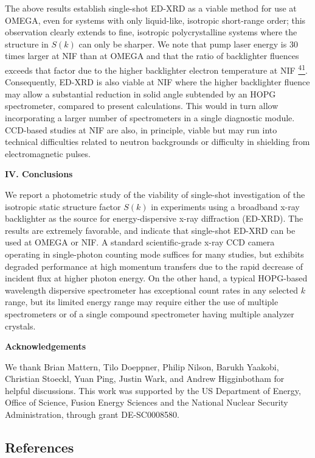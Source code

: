 The above results establish single-shot ED-XRD as a viable method for
use at OMEGA, even for systems with only liquid-like, isotropic
short-range order; this observation clearly extends to fine, isotropic
polycrystalline systems where the structure in \(S(k)\) can only be
sharper. We note that pump laser energy is 30 times larger at NIF than
at OMEGA and that the ratio of backlighter fluences exceeds that factor
due to the higher backlighter electron temperature at NIF
\hyperref[b.-r.-maddox-et-al.-physics-of-plasmas-18-056709-2011.]{\textsuperscript{41}}.
Consequently, ED-XRD is also viable at NIF where the higher backlighter
fluence may allow a substantial reduction in solid angle subtended by an
HOPG spectrometer, compared to present calculations. This would in turn
allow incorporating a larger number of spectrometers in a single
diagnostic module. CCD-based studies at NIF are also, in principle,
viable but may run into technical difficulties related to neutron
backgrounds or difficulty in shielding from electromagnetic pulses.

\textbf{IV. Conclusions}

We report a photometric study of the viability of single-shot
investigation of the isotropic static structure factor \(S(k)\) in
experiments using a broadband x-ray backlighter as the source for
energy-dispersive x-ray diffraction (ED-XRD). The results are extremely
favorable, and indicate that single-shot ED-XRD can be used at OMEGA or
NIF. A standard scientific-grade x-ray CCD camera operating in
single-photon counting mode suffices for many studies, but exhibits
degraded performance at high momentum transfers due to the rapid
decrease of incident flux at higher photon energy. On the other hand, a
typical HOPG-based wavelength dispersive spectrometer has exceptional
count rates in any selected \(k\) range, but its limited energy range
may require either the use of multiple spectrometers or of a single
compound spectrometer having multiple analyzer crystals.

\textbf{Acknowledgements}

We thank Brian Mattern, Tilo Doeppner, Philip Nilson, Barukh Yaakobi,
Christian Stoeckl, Yuan Ping, Justin Wark, and Andrew Higginbotham for
helpful discussions. This work was supported by the US Department of
Energy, Office of Science, Fusion Energy Sciences and the National
Nuclear Security Administration, through grant DE-SC0008580.\textbf{\\}

\subsection{References}\label{references}

